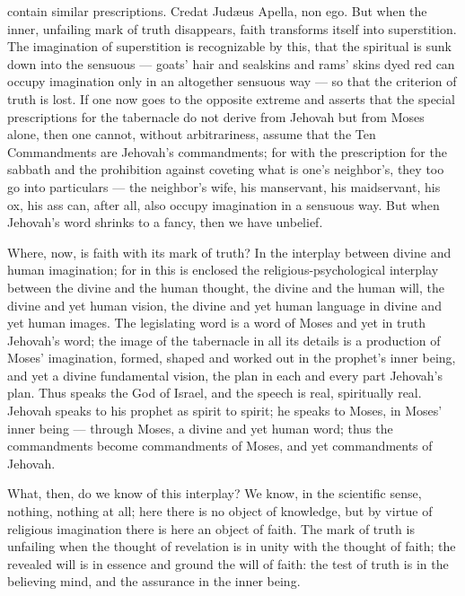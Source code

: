 \documentclass[12pt,a4paper,openany]{book}
\newcommand{\opage}[1]{\marginnote{\footnotesize\textit{[#1]}}}
\begin{document}
\opage{48}contain similar prescriptions. Credat Judæus Apella, non ego. But when the inner, unfailing mark of truth disappears, faith transforms itself into superstition. The imagination of superstition is recognizable by this, that the spiritual is sunk down into the sensuous --- goats' hair and sealskins and rams' skins dyed red can occupy imagination only in an altogether sensuous way --- so that the criterion of truth is lost. If one now goes to the opposite extreme and asserts that the special prescriptions for the tabernacle do not derive from Jehovah but from Moses alone, then one cannot, without arbitrariness, assume that the Ten Commandments are Jehovah's commandments; for with the prescription for the sabbath and the prohibition against coveting what is one's neighbor's, they too go into particulars --- the neighbor's wife, his manservant, his maidservant, his ox, his ass can, after all, also occupy imagination in a sensuous way. But when Jehovah's word shrinks to a fancy, then we have unbelief.

Where, now, is faith with its mark of truth? In the interplay between divine and human imagination; for in this is enclosed the religious-psychological interplay between the divine and the human thought, the divine and the human will, the divine and yet human vision, the divine and yet human language in divine and yet human images. The legislating word is a word of Moses and yet in truth Jehovah's word; the image of the tabernacle in all its details is a production of Moses' imagination, formed, shaped and worked out in the prophet's inner being, and yet a divine fundamental vision, the plan in each and every part Jehovah's plan. Thus speaks the God of Israel, and the speech is
\setcounter{footnote}{0}%
\opage{49}real, spiritually real. Jehovah speaks to his prophet as spirit to spirit; he speaks to Moses, in Moses' inner being --- through Moses, a divine and yet human word; thus the commandments become commandments of Moses, and yet commandments of Jehovah.

What, then, do we know of this interplay? We know, in the scientific sense, nothing, nothing at all; here there is no object of knowledge, but by virtue of religious imagination there is here an object of faith. The mark of truth is unfailing when the thought of revelation is in unity with the thought of faith; the revealed will is in essence and ground the will of faith: the test of truth is in the believing mind, and the assurance in the inner being.
\end{document}
